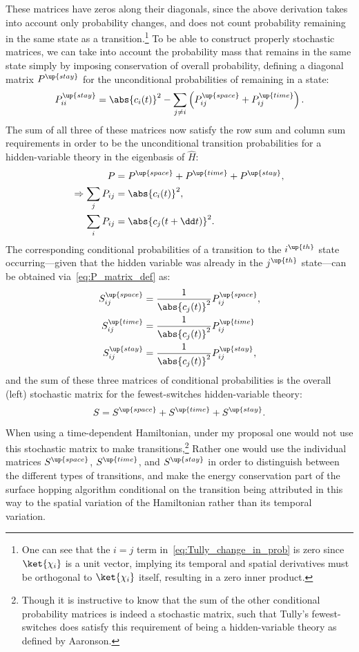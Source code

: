 These matrices have zeros along their diagonals, since the above derivation takes into account only probability changes, and does not count probability remaining in the same state as a transition.\footnote{One can see that the $i=j$ term in~\eqref{eq:Tully_change_in_prob} is zero since $\ket{\chi_i}$ is a unit vector, implying its temporal and spatial derivatives must be orthogonal to $\ket{\chi_i}$ itself, resulting in a zero inner product.} To be able to construct properly stochastic matrices, we can take into account the probability mass that remains in the same state simply by imposing conservation of overall probability, defining a diagonal matrix $P^\up{stay}$ for the unconditional probabilities of remaining in a state:
\begin{align}
P^\up{stay}_{ii} = \abs{c_i(t)}^2
- \sum_{j\neq i} \left(P^\up{space}_{ij} + P^\up{time}_{ij}\right).
\end{align}
The sum of all three of these matrices now satisfy the row sum and column sum requirements in order to be the unconditional transition probabilities for a hidden-variable theory in the eigenbasis of $\hat H$:
\begin{align}
P &= P^\up{space} + P^\up{time} + P^\up{stay},\\
\Rightarrow \sum_j P_{ij} &= \abs{c_i(t)}^2,\\
\sum_i P_{ij} &= \abs{c_j(t + \dd t)}^2.
\end{align}
The corresponding conditional probabilities of a transition to the $i^\up{th}$ state occurring---given that the hidden variable was already in the $j^\up{th}$ state---can be obtained via~\eqref{eq:P_matrix_def} as:
\begin{align}
S^\up{space}_{ij} &= \frac1{\abs{c_j(t)}^2} P^\up{space}_{ij},\label{eq:S_space}\\
S^\up{time}_{ij} &= \frac1{\abs{c_j(t)}^2} P^\up{time}_{ij}\label{eq:S_time}\\
S^\up{stay}_{ij} &= \frac1{\abs{c_j(t)}^2} P^\up{stay}_{ij}\label{eq:S_stay},
\end{align}
and the sum of these three matrices of conditional probabilities is the overall (left) stochastic matrix for the fewest-switches hidden-variable theory:
\begin{align}
S = S^\up{space} + S^\up{time} + S^\up{stay}.
\end{align}
When using a time-dependent Hamiltonian, under my proposal one would not use this stochastic matrix to make transitions,\footnote{Though it is instructive to know that the sum of the other conditional probability matrices is indeed a stochastic matrix, such that Tully's fewest-switches does satisfy this requirement of being a hidden-variable theory as defined by Aaronson.} Rather one would use the individual matrices $S^\up{space}$, $S^\up{time}$, and $S^\up{stay}$ in order to distinguish between the different types of transitions, and make the energy conservation part of the surface hopping algorithm conditional on the transition being attributed in this way to the spatial variation of the Hamiltonian rather than its temporal variation.

